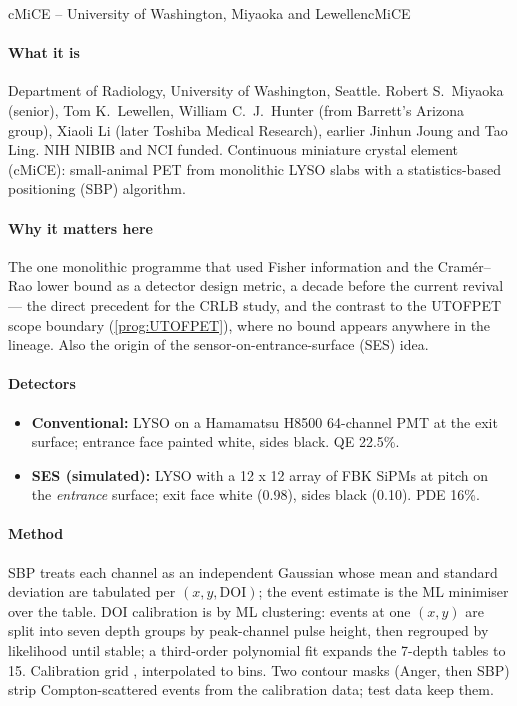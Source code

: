 \begin{programnote}{cMiCE -- University of Washington, Miyaoka and Lewellen}{cMiCE}

\paragraph{What it is}
Department of Radiology, University of Washington, Seattle. Robert S.\ Miyaoka
(senior), Tom K.\ Lewellen, William C.\ J.\ Hunter (from Barrett's Arizona
group), Xiaoli Li (later Toshiba Medical Research), earlier Jinhun Joung and Tao
Ling. NIH NIBIB and NCI funded. Continuous miniature crystal element (cMiCE):
small-animal PET from monolithic LYSO slabs with a statistics-based positioning
(SBP) algorithm.

\paragraph{Why it matters here}
The one monolithic programme that used Fisher information and the Cram\'er--Rao
lower bound as a detector design metric, a decade before the current revival ---
the direct precedent for the CRLB study, and the contrast to the UTOFPET scope
boundary (\ref{prog:UTOFPET}), where no bound appears anywhere in the lineage.
Also the origin of the sensor-on-entrance-surface (SES) idea.

\paragraph{Detectors}
\begin{itemize}
	\item \textbf{Conventional:}  LYSO on a
		Hamamatsu H8500 64-channel PMT at the exit surface; entrance face painted
		white, sides black. QE 22.5\%.
	\item \textbf{SES (simulated):} 
		LYSO with a 12 x 12 array of  FBK SiPMs
		at  pitch on the \emph{entrance} surface; exit face white (0.98),
		sides black (0.10). PDE 16\%.
\end{itemize}

\paragraph{Method}
SBP treats each channel as an independent Gaussian whose mean and standard
deviation are tabulated per $(x, y, \text{DOI})$; the event estimate is the ML
minimiser over the table. DOI calibration is by ML clustering: events at one
$(x, y)$ are split into seven depth groups by peak-channel pulse height, then
regrouped by likelihood until stable; a third-order polynomial fit expands the
7-depth tables to 15. Calibration grid , interpolated to 
bins. Two contour masks (Anger, then SBP) strip Compton-scattered events from the
calibration data; test data keep them.


\end{programnote}
